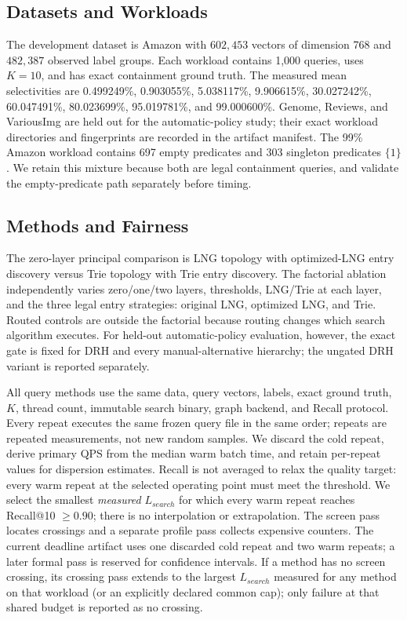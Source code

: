 \documentclass[sigconf,review,anonymous]{acmart}
\begin{document}
\subsection{Datasets and Workloads}
The development dataset is Amazon with $602{,}453$ vectors of dimension 768 and
$482{,}387$ observed label groups.  Each workload contains 1,000 queries, uses
$K=10$, and has exact containment ground truth.  The measured mean
selectivities are 0.499249\%, 0.903055\%, 5.038117\%, 9.906615\%, 30.027242\%,
60.047491\%, 80.023699\%, 95.019781\%, and 99.000600\%.  Genome, Reviews, and
VariousImg are held out for the automatic-policy study; their exact workload
directories and fingerprints are recorded in the artifact manifest.
\authoritativeDatasetTable
The 99\% Amazon workload contains 697 empty predicates and 303 singleton
predicates $\{1\}$.  We retain this mixture because both are legal containment
queries, and validate the empty-predicate path separately before timing.

\subsection{Methods and Fairness}
The zero-layer principal comparison is LNG topology with optimized-LNG entry
discovery versus Trie topology with Trie entry discovery.  The factorial
ablation independently varies zero/one/two layers, thresholds, LNG/Trie at each
layer, and the three legal entry strategies: original LNG, optimized LNG, and
Trie.  Routed controls are outside the factorial because routing changes which
search algorithm executes. For held-out automatic-policy evaluation, however,
the exact gate is fixed for DRH and every manual-alternative hierarchy; the
ungated DRH variant is reported separately.

All query methods use the same data, query vectors, labels, exact ground truth,
$K$, thread count, immutable search binary, graph backend, and Recall protocol.
\authoritativeQueryExecution
Every repeat executes the same frozen query file in the same order; repeats are
repeated measurements, not new random samples.  We discard the cold repeat,
derive primary QPS from the median warm batch time, and retain per-repeat values
for dispersion estimates.  Recall is not averaged to relax the quality target:
every warm repeat at the selected operating point must meet the threshold.
We select the smallest \emph{measured} $L_{search}$ for which every warm repeat
reaches Recall@10 $\ge0.90$; there is no interpolation or extrapolation.  The
screen pass locates crossings and a separate profile pass collects expensive
counters. The current deadline artifact uses one discarded cold repeat and two
warm repeats; a later formal pass is reserved for confidence intervals. If a method has no screen crossing, its
crossing pass extends to the largest $L_{search}$ measured for any method on
that workload (or an explicitly declared common cap); only failure at that
shared budget is reported as no crossing.
\authoritativeSharedSearchBudgetTable
\end{document}

